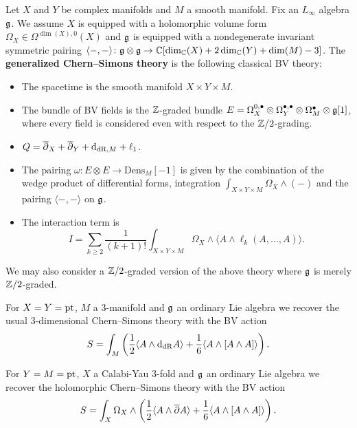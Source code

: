 \documentclass[10pt, oneside]{article}
\newcommand{\Dens}{\mathrm{Dens}}
\begin{document}
\begin{definition}
Let $X$ and $Y$ be complex manifolds and $M$ a smooth manifold. Fix an $L_\infty$ algebra $\mathfrak g$. We assume $X$ is equipped with a holomorphic volume form $\Omega_X \in\Omega^{\dim(X), 0}(X)$ and $\mathfrak g$ is equipped with a nondegenerate invariant symmetric pairing $\langle-, -\rangle\colon \mathfrak g\otimes\mathfrak g\rightarrow \mathbb C[\dim_\mathbb C(X) + 2\dim_\mathbb C(Y) + \dim(M) - 3]$. The {\bf generalized Chern--Simons theory} is the following classical BV theory:
\begin{itemize}
\item The spacetime is the smooth manifold $X\times Y\times M$.

\item The bundle of BV fields is the $\mathbb Z$-graded bundle $E = \Omega^{0,\bullet}_X \otimes \Omega^{\bullet,\bullet}_Y \otimes \Omega^\bullet_M \otimes \mathfrak g[1]$, where every field is considered even with respect to the $\mathbb Z/2$-grading.

\item $Q = \overline{\partial}_X + \overline{\partial}_Y + {\rm d}_{\mathrm{dR}, M} + \ell_1$.

\item The pairing $\omega\colon E\otimes E\rightarrow \Dens_M[-1]$ is given by the combination of the wedge product of differential forms, integration $\int_{X\times Y\times M} \Omega_X\wedge (-)$ and the pairing $\langle -, -\rangle$ on $\mathfrak g$.

\item The interaction term is
\[I = \sum_{k\geq 2}\frac{1}{(k+1)!} \int_{X\times Y\times M} \Omega_X\wedge \langle A\wedge \ell_k(A, \dots, A)\rangle.\]
\end{itemize}
\label{def:generalizedBF}
\end{definition}

We may also consider a $\mathbb Z/2$-graded version of the above theory where $\mathfrak g$ is merely $\mathbb Z/2$-graded.

\begin{example}
For $X=Y=\operatorname{pt}$, $M$ a 3-manifold and $\mathfrak g$ an ordinary Lie algebra we recover the usual 3-dimensional Chern--Simons theory with the BV action
\[S = \int_M \left(\frac{1}{2}\langle A\wedge {\rm d}_{\mathrm{dR}} A\rangle + \frac{1}{6}\langle A\wedge [A\wedge A]\rangle\right).\]
\end{example}

\begin{example}
For $Y=M=\operatorname{pt}$, $X$ a Calabi-Yau 3-fold and $\mathfrak g$ an ordinary Lie algebra we recover the holomorphic Chern--Simons theory with the BV action
\[S = \int_X \Omega_X\wedge \left(\frac{1}{2}\langle A\wedge \overline{\partial} A\rangle + \frac{1}{6}\langle A\wedge [A\wedge A]\rangle\right).\]
\end{example}
\end{document}
